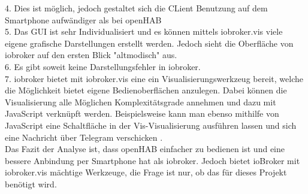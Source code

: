 4. Dies ist möglich, jedoch gestaltet sich die CLient Benutzung auf dem Smartphone aufwändiger als bei openHAB\\
5. Das GUI ist sehr Individualisiert und es können mittels iobroker.vis viele eigene grafische Darstellungen erstellt werden. Jedoch sieht die Oberfläche von iobroker auf den ersten Blick "altmodisch" aus.\\
6. Es gibt soweit keine Darstellungsfehler in iobroker.\\
7. iobroker bietet mit iobroker.vis eine ein Visualisierungswerkzeug bereit, welche die Möglichkeit bietet eigene Bedienoberflächen anzulegen. Dabei können die Visualisierung alle Möglichen Komplexitätsgrade annehmen und dazu mit JavaScript verknüpft werden. Beispielsweise kann man ebenso mithilfe von JavaScript eine Schaltfläche in der Vis-Visualisierung ausführen lassen und sich eine Nachricht über Telegram verschicken \cite{korte_script_2018}.\\
Das Fazit der Analyse ist, dass openHAB einfacher zu bedienen ist und eine bessere Anbindung per Smartphone hat als iobroker. Jedoch bietet ioBroker mit iobroker.vis mächtige Werkzeuge, die Frage ist nur, ob das für dieses Projekt benötigt wird.